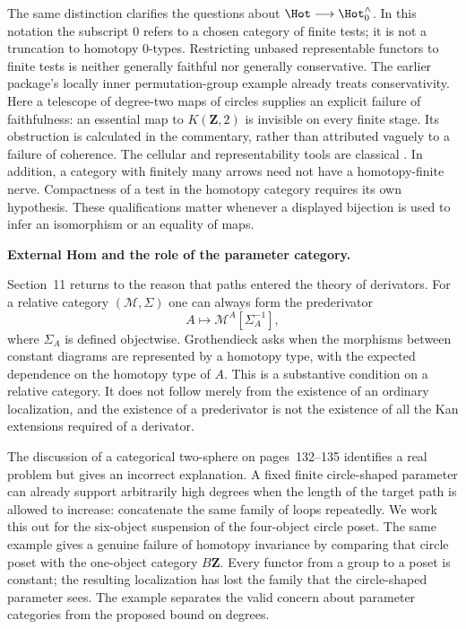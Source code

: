 The same distinction clarifies the questions about
$\Hot\longrightarrow\Hot_0^{\wedge}$.  In this notation the subscript $0$
refers to a chosen category of finite tests; it is not a truncation to
homotopy $0$-types.  Restricting unbased representable functors to finite tests
is neither generally faithful nor generally conservative.  The earlier
package's locally inner permutation-group example already treats
conservativity.  Here a telescope of degree-two maps of circles supplies an
explicit failure of faithfulness: an essential map to $K(\mathbf Z,2)$ is
invisible on every finite stage.  Its obstruction is calculated in the
commentary, rather than attributed vaguely to a failure of coherence.  The
cellular and representability tools are classical
\citep[\S3F and Theorem~4.57]{Hatcher2002}.  In addition, a category with
finitely many arrows need not have a homotopy-finite nerve.  Compactness of a
test in the homotopy category requires its own hypothesis.  These qualifications
matter whenever a displayed bijection is used to infer an isomorphism or an
equality of maps.

\medskip\noindent\textbf{External Hom and the role of the parameter category.}

Section~11 returns to the reason that paths entered the theory of derivators.
For a relative category $(\mathcal M,\Sigma)$ one can always form the
prederivator
\[
 A\longmapsto\mathcal M^A[\Sigma_A^{-1}],
\]
where $\Sigma_A$ is defined objectwise.  Grothendieck asks when the morphisms
between constant diagrams are represented by a homotopy type, with the expected
dependence on the homotopy type of $A$.  This is a substantive condition on a
relative category.  It does not follow merely from the existence of an
ordinary localization, and the existence of a prederivator is not the
existence of all the Kan extensions required of a derivator.

The discussion of a categorical two-sphere on pages~132--135 identifies a real
problem but gives an incorrect explanation.  A fixed finite circle-shaped
parameter can already support arbitrarily high degrees when the length of the
target path is allowed to increase: concatenate the same family of loops
repeatedly.  We work this out for the six-object suspension of the four-object
circle poset.  The same example gives a genuine failure of homotopy invariance
by comparing that circle poset with the one-object category $B\mathbf Z$.
Every functor from a group to a poset is constant; the resulting localization
has lost the family that the circle-shaped parameter sees.  The example
separates the valid concern about parameter categories from the proposed
bound on degrees.

